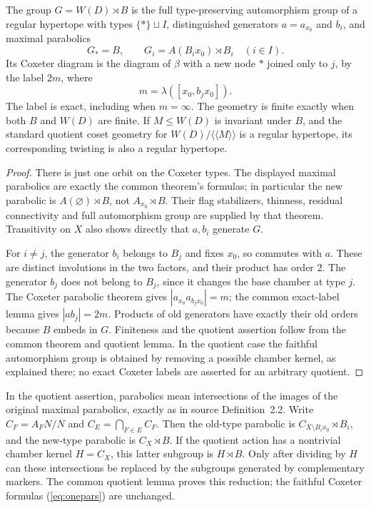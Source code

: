 \begin{theorem}\label{thm:one}
The group $G=W(D)\rtimes B$ is the full type-preserving automorphism group of a regular hypertope with types $\{*\}\sqcup I$, distinguished generators $a=a_{x_0}$ and $b_i$, and maximal parabolics
\begin{equation}\label{eq:onepars}
G_*=B,\qquad G_i=A(B_ix_0)\rtimes B_i\quad(i\in I).
\end{equation}
Its Coxeter diagram is the diagram of $\beta$ with a new node $*$ joined only to $j$, by the label $2m$, where
\[
m=\lambda([x_0,b_jx_0]).
\]
The label is exact, including when $m=\infty$. The geometry is finite exactly when both $B$ and $W(D)$ are finite. If $M\leq W(D)$ is invariant under $B$, and the standard quotient coset geometry for $W(D)/\langle\!\langle M\rangle\!\rangle$ is a regular hypertope, its corresponding twisting is also a regular hypertope.
\end{theorem}
\begin{proof}
There is just one orbit on the Coxeter types. The displayed maximal parabolics are exactly the common theorem's formulas; in particular the new parabolic is $A(\varnothing)\rtimes B$, not $A_{x_0}\rtimes B$. Their flag stabilizers, thinness, residual connectivity and full automorphism group are supplied by that theorem. Transitivity on $X$ also shows directly that $a,b_i$ generate $G$.

For $i\ne j$, the generator $b_i$ belongs to $B_j$ and fixes $x_0$, so commutes with $a$. These are distinct involutions in the two factors, and their product has order $2$. The generator $b_j$ does not belong to $B_j$, since it changes the base chamber at type $j$. The Coxeter parabolic theorem gives $|a_{x_0}a_{b_jx_0}|=m$; the common exact-label lemma gives $|ab_j|=2m$. Products of old generators have exactly their old orders because $B$ embeds in $G$. Finiteness and the quotient assertion follow from the common theorem and quotient lemma. In the quotient case the faithful automorphism group is obtained by removing a possible chamber kernel, as explained there; no exact Coxeter labels are asserted for an arbitrary quotient.
\end{proof}

In the quotient assertion, parabolics mean intersections of the images of the original maximal parabolics, exactly as in source Definition~2.2. Write $C_F=A_FN/N$ and $C_E=\bigcap_{F\in E}C_F$. Then the old-type parabolic is $C_{X\setminus B_ix_0}\rtimes B_i$, and the new-type parabolic is $C_X\rtimes B$. If the quotient action has a nontrivial chamber kernel $H=C_X$, this latter subgroup is $H\rtimes B$. Only after dividing by $H$ can these intersections be replaced by the subgroups generated by complementary markers. The common quotient lemma proves this reduction; the faithful Coxeter formulas (\ref{eq:onepars}) are unchanged.

